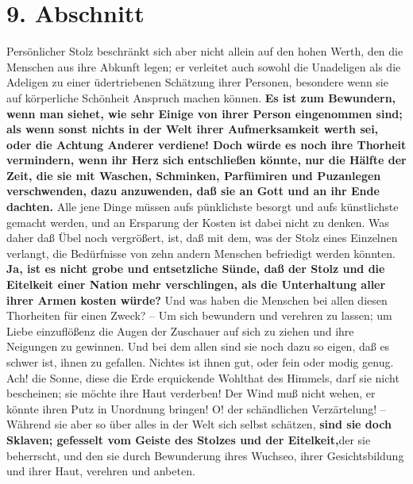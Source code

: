 \section{9. Abschnitt} \label{kap11_ab9}

Persönlicher Stolz beschränkt sich aber nicht allein auf den hohen Werth, den
die Menschen aus ihre Abkunft legen; er verleitet auch sowohl die Unadeligen als
die Adeligen zu einer üdertriebenen Schätzung ihrer Personen, besondere wenn sie
auf körperliche Schönheit Anspruch machen können. \textbf{Es
ist zum Bewundern, wenn man
siehet, wie sehr Einige von ihrer Person eingenommen sind; als wenn sonst nichts
in der Welt ihrer Aufmerksamkeit werth sei, oder die Achtung Anderer verdiene!
Doch würde es noch ihre Thorheit vermindern, wenn ihr Herz sich entschließen
könnte, nur die Hälfte der Zeit, die sie mit Waschen,
Schminken, Parfümiren und
Puzanlegen verschwenden, dazu anzuwenden, daß sie an Gott und an ihr Ende
dachten.} Alle jene Dinge müssen aufs pünklichste besorgt und aufs künstlichste
gemacht werden, und an Ersparung der Kosten ist dabei nicht zu denken. Was daher
daß Übel noch vergrößert, ist, daß mit dem, was der Stolz eines Einzelnen
verlangt, die Bedürfnisse von zehn andern Menschen befriedigt werden könnten.
\textbf{Ja, ist es nicht grobe und entsetzliche Sünde, daß der
Stolz und die Eitelkeit
einer Nation mehr verschlingen, als die Unterhaltung aller ihrer Armen kosten
würde?} Und was haben die Menschen bei allen diesen Thorheiten für einen Zweck?
-- Um sich bewundern und verehren zu lassen; um Liebe einzuflößenz die Augen der
Zuschauer auf sich zu ziehen und ihre Neigungen zu gewinnen. Und bei dem allen
sind sie noch dazu so eigen, daß es schwer ist, ihnen zu gefallen. Nichtes ist
ihnen gut, oder fein oder modig genug. Ach! die Sonne, diese
die Erde
erquickende Wohlthat des Himmels, darf sie nicht bescheinen; sie möchte ihre
Haut verderben! Der Wind muß nicht wehen, er könnte ihren Putz in Unordnung
bringen! O! der schändlichen Verzärtelung! -- Während sie aber so über alles in
der Welt sich selbst schätzen, \textbf{sind sie doch Sklaven;
gefesselt vom Geiste des
Stolzes und der Eitelkeit,}der sie beherrscht, und den sie durch Bewunderung
ihres Wuchseo, ihrer Gesichtsbildung und ihrer Haut, verehren und anbeten.

